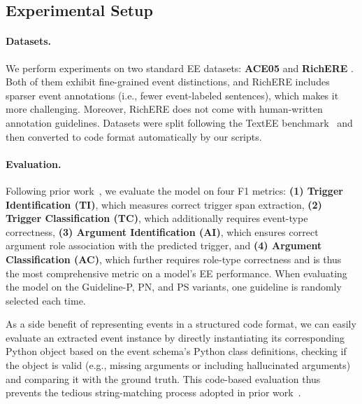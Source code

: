 \subsection{Experimental Setup} 
\paragraph{Datasets.}
We perform experiments on two standard EE datasets: \textbf{ACE05} \cite{doddington-etal-2004-automatic} and \textbf{RichERE} \cite{song-etal-2015-light}. Both of them exhibit fine-grained event distinctions, and RichERE includes sparser event annotations (i.e., fewer event-labeled sentences), which makes it more challenging. Moreover, RichERE does not come with human-written annotation guidelines. Datasets were split following the TextEE benchmark~\cite{huang2024textee} and then converted to code format automatically by our scripts. 


\paragraph{Evaluation.} 
Following prior work~\cite{huang2024textee}, we evaluate the model on four F1 metrics:
\textbf{(1) Trigger Identification (TI)}, which measures correct trigger span extraction, \textbf{(2) Trigger Classification (TC)}, which additionally requires event-type correctness, \textbf{(3) Argument Identification (AI)}, which ensures correct argument role association with the predicted trigger, and \textbf{(4) Argument Classification (AC)}, which further requires role-type correctness and is thus the most comprehensive metric on a model's EE performance. When evaluating the model on the Guideline-P, PN, and PS variants, one guideline is randomly selected each time.

As a side benefit of representing events in a structured code format, we can easily evaluate an extracted event instance by directly instantiating its corresponding Python object based on the event schema's Python class definitions, checking if the object is valid (e.g., missing arguments or including hallucinated arguments) and comparing it with the ground truth. This code-based evaluation thus prevents the tedious string-matching process adopted in prior work~\cite{li-etal-2021-document}. 

